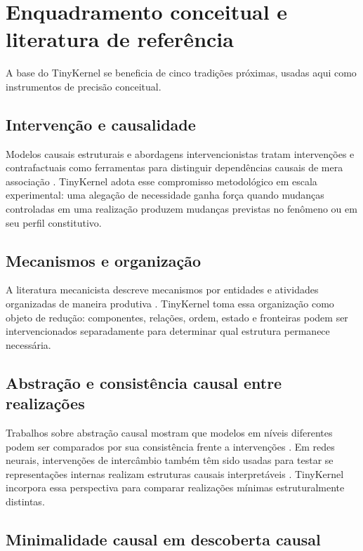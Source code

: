 \documentclass[11pt,a4paper]{article}
\begin{document}
\section{Enquadramento conceitual e literatura de referência}

A base do TinyKernel se beneficia de cinco tradições próximas, usadas aqui como
instrumentos de precisão conceitual.

\subsection{Intervenção e causalidade}

Modelos causais estruturais e abordagens intervencionistas tratam intervenções e
contrafactuais como ferramentas para distinguir dependências causais de mera
associação \cite{pearl2009,woodward2003}. TinyKernel adota esse compromisso
metodológico em escala experimental: uma alegação de necessidade ganha força quando
mudanças controladas em uma realização produzem mudanças previstas no fenômeno ou em
seu perfil constitutivo.

\subsection{Mecanismos e organização}

A literatura mecanicista descreve mecanismos por entidades e atividades organizadas
de maneira produtiva \cite{machamer2000}. TinyKernel toma essa organização como
objeto de redução: componentes, relações, ordem, estado e fronteiras podem ser
intervencionados separadamente para determinar qual estrutura permanece necessária.

\subsection{Abstração e consistência causal entre realizações}

Trabalhos sobre abstração causal mostram que modelos em níveis diferentes podem ser
comparados por sua consistência frente a intervenções \cite{rubenstein2017,beckers2019}.
Em redes neurais, intervenções de intercâmbio também têm sido usadas para testar se
representações internas realizam estruturas causais interpretáveis
\cite{geiger2021}. TinyKernel incorpora essa perspectiva para comparar realizações
mínimas estruturalmente distintas.

\subsection{Minimalidade causal em descoberta causal}
\end{document}
